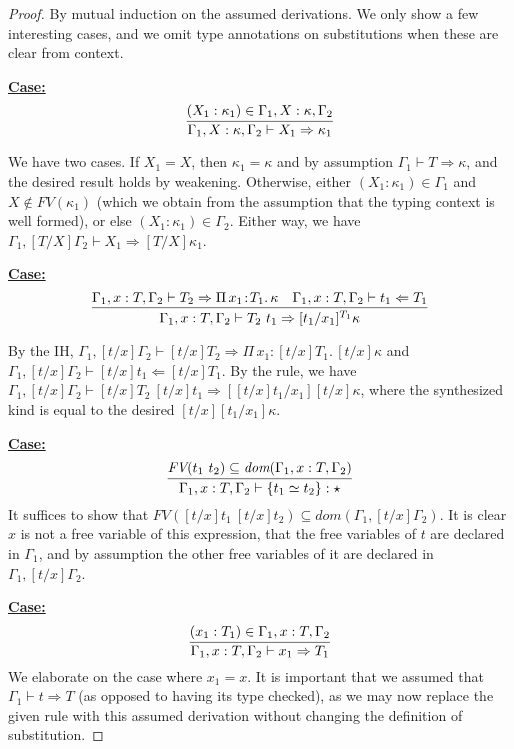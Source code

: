 \documentclass{article}
\newcommand{\abs}[4]{{#1}\, #2\! : \! #3.\, #4}
\newcommand{\tpcheck}[0]{\Leftarrow}
\newcommand{\tpsynth}[0]{\Rightarrow}
\newcommand{\startcase}[1]{\vspace{#1} \noindent\textbf{\underline{Case:}}}
\begin{document}
\begin{proof}
  By mutual induction on the assumed derivations.
  We only show a few interesting cases, and we omit type annotations on
  substitutions when these are clear from context.
  
  \startcase{.2cm}
  \[
    \infer{\Gamma_1,X:\kappa,\Gamma_2 \vdash X_1 \tpsynth \kappa_1}{(X_1 : \kappa_1) \in \Gamma_1,X:\kappa,\Gamma_2}
  \]

  We have two cases.
  If \(X_1 = X\), then \(\kappa_1 = \kappa\) and by assumption \(\Gamma_1 \vdash
  T \tpsynth \kappa\), and the desired result holds by weakening.
  Otherwise, either \((X_1 : \kappa_1) \in \Gamma_1\) and \(X \notin
  \textit{FV}(\kappa_1)\) (which we obtain from the assumption that the typing
  context is well formed), or else \((X_1 : \kappa_1) \in \Gamma_2\). 
  Either way, we have \(\Gamma_1,[T/X]\Gamma_2 \vdash X_1 \tpsynth
  [T/X]\kappa_1\).

  \startcase{.2cm}
  \[ \infer{\Gamma_1,x:T,\Gamma_2\vdash T_2\ t_1 \tpsynth [t_1/x_1]^{T_1}\kappa
    }{
      \Gamma_1,x:T,\Gamma_2\vdash T_2 \tpsynth \abs{\Pi}{x_1}{T_1}{\kappa}
      & \Gamma_1,x:T,\Gamma_2\vdash t_1 \tpcheck T_1
    }
  \]

  By the IH, \(\Gamma_1,[t/x]\Gamma_2 \vdash [t/x]T_2 \tpsynth
  \abs{\Pi}{x_1}{[t/x]T_1}{[t/x]\kappa}\) and \(\Gamma_1,[t/x]\Gamma_2 \vdash
  [t/x]t_1 \tpcheck [t/x]T_1\).
  By the rule, we have \(\Gamma_1,[t/x]\Gamma_2 \vdash [t/x]T_2\ [t/x]t_1
  \tpsynth [[t/x]t_1/x_1][t/x]\kappa\), where the synthesized kind is equal to
  the desired \([t/x][t_1/x_1]\kappa\).

  \startcase{.2cm}
  \[
    \infer{
      \Gamma_1,x:T,\Gamma_2\vdash \{ t_1 \simeq t_2 \} : \star
    }{
      \textit{FV}(t_1\ t_2)\subseteq\textit{dom}(\Gamma_1,x:T,\Gamma_2)
    }
  \]
  It suffices to show that \(\textit{FV}([t/x]t_1\ [t/x]t_2) \subseteq
  \textit{dom}(\Gamma_1,[t/x]\Gamma_2)\).
  It is clear \(x\) is not a free variable of this expression, that the free
  variables of \(t\) are declared in \(\Gamma_1\), and by assumption the other
  free variables of it are declared in \(\Gamma_1,[t/x]\Gamma_2\).

  \startcase{.2cm}
  \[
    \infer{\Gamma_1,x:T,\Gamma_2 \vdash x_1\tpsynth T_1}{(x_1 : T_1) \in \Gamma_1,x:T,\Gamma_2}
  \]
  We elaborate on the case where \(x_1 = x\).
  It is important that we assumed that \(\Gamma_1 \vdash t \tpsynth T\) (as
  opposed to having its type checked), as we may now replace the given rule with
  this assumed derivation without changing the definition of substitution.


\end{proof}
\end{document}
